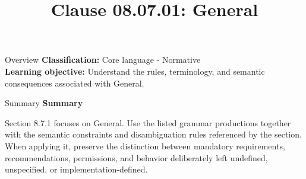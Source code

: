 \documentclass[10pt,letterpaper]{article}
\title{Clause 08.07.01: General}
\author{}
\date{}
\begin{document}
\maketitle
\begin{CornellOverviewBox}{Overview}
\textbf{Classification:} Core language - Normative\\[2pt]
\textbf{Learning objective:} Understand the rules, terminology, and semantic consequences associated with General.
\end{CornellOverviewBox}\begin{CornellSummaryBox}{Summary}
{\sffamily\bfseries\color{Accent} Summary}\par\vspace{3pt}Section 8.7.1 focuses on General. Use the listed grammar productions together with the semantic constraints and disambiguation rules referenced by the section. When applying it, preserve the distinction between mandatory requirements, recommendations, permissions, and behavior deliberately left undefined, unspecified, or implementation-defined.
\end{CornellSummaryBox}
\end{document}
